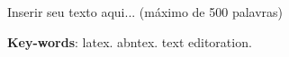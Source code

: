 %
%

\begin{resumo}[Abstract]
	Inserir seu texto aqui... (máximo de 500 palavras)

	\textbf{Key-words}: latex. abntex. text editoration.
\end{resumo}

